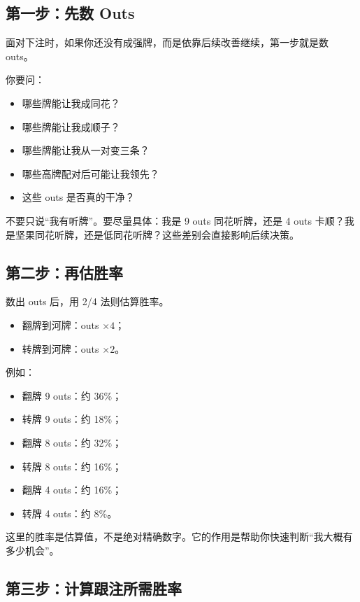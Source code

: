 \subsection{第一步：先数 Outs}

面对下注时，如果你还没有成强牌，而是依靠后续改善继续，第一步就是数 outs。

你要问：

\begin{itemize}
\item 哪些牌能让我成同花？
\item 哪些牌能让我成顺子？
\item 哪些牌能让我从一对变三条？
\item 哪些高牌配对后可能让我领先？
\item 这些 outs 是否真的干净？
\end{itemize}

不要只说“我有听牌”。要尽量具体：我是 9 outs 同花听牌，还是 4 outs 卡顺？我是坚果同花听牌，还是低同花听牌？这些差别会直接影响后续决策。

\subsection{第二步：再估胜率}

数出 outs 后，用 2/4 法则估算胜率。

\begin{itemize}
\item 翻牌到河牌：outs $\times 4$；
\item 转牌到河牌：outs $\times 2$。
\end{itemize}

例如：

\begin{itemize}
\item 翻牌 9 outs：约 36\%；
\item 转牌 9 outs：约 18\%；
\item 翻牌 8 outs：约 32\%；
\item 转牌 8 outs：约 16\%；
\item 翻牌 4 outs：约 16\%；
\item 转牌 4 outs：约 8\%。
\end{itemize}

这里的胜率是估算值，不是绝对精确数字。它的作用是帮助你快速判断“我大概有多少机会”。

\subsection{第三步：计算跟注所需胜率}

